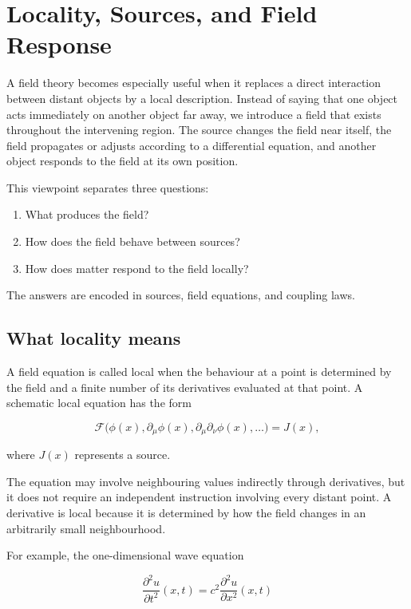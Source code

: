 \section{Locality, Sources, and Field Response}
\label{sec:locality_sources_response}

A field theory becomes especially useful when it replaces a direct interaction between distant objects by a local description. Instead of saying that one object acts immediately on another object far away, we introduce a field that exists throughout the intervening region. The source changes the field near itself, the field propagates or adjusts according to a differential equation, and another object responds to the field at its own position.

This viewpoint separates three questions:

\begin{enumerate}
    \item What produces the field?
    \item How does the field behave between sources?
    \item How does matter respond to the field locally?
\end{enumerate}

The answers are encoded in sources, field equations, and coupling laws.

\subsection{What locality means}

A field equation is called local when the behaviour at a point is determined by the field and a finite number of its derivatives evaluated at that point. A schematic local equation has the form

\[
\mathcal{F}
\bigl(
\phi(x),
\partial_{\mu}\phi(x),
\partial_{\mu}\partial_{\nu}\phi(x),
\ldots
\bigr)
=
J(x),
\]

where \(J(x)\) represents a source.

The equation may involve neighbouring values indirectly through derivatives, but it does not require an independent instruction involving every distant point. A derivative is local because it is determined by how the field changes in an arbitrarily small neighbourhood.

For example, the one-dimensional wave equation

\[
\frac{\partial^{2}u}{\partial t^{2}}(x,t)
=
c^{2}
\frac{\partial^{2}u}{\partial x^{2}}(x,t)
\]

